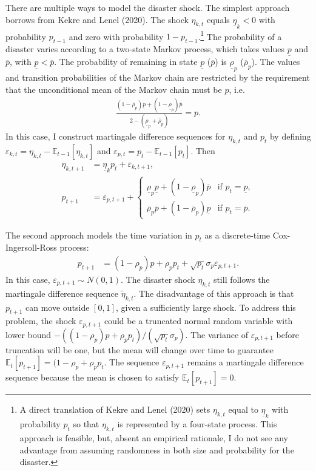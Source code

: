 \documentclass[12 pt, oneside]{article}
\theoremstyle{definition}
\theoremstyle{definition}
\theoremstyle{definition}
\newcommand{\E}{\mathbb{E}}
\begin{document}
There are multiple ways to model the disaster shock. The simplest approach borrows from Kekre and Lenel (2020). The shock $\eta_{k, t}$ equals $\underline{\eta}_k < 0$ with probability $p_{t - 1}$ and zero with probability $1 - p_{t - 1}$.\footnote{A direct translation of Kekre and Lenel (2020) sets $\eta_{k, t}$ equal to $\underline{\eta}_k$ with probability $p_t$ so that $\eta_{k, t}$ is represented by a four-state process. This approach is feasible, but, absent an empirical rationale, I do not see any advantage from assuming randomness in both size and probability for the disaster.} The probability of a disaster varies according to a two-state Markov process, which takes values $\underline{p}$ and $\overline{p}$, with $\underline{p} < \overline{p}$. The probability of remaining in state $\underline{p}$ ($\overline{p}$) is $\underline{\rho}_p$ ($\overline{\rho}_p$). The values and transition probabilities of the Markov chain are restricted by the requirement that the unconditional mean of the Markov chain must be $p$, i.e.
\begin{align*}
  \frac{(1 - \overline{\rho}_p)\underline{p} + (1 - \underline{\rho}_p) \overline{p}}{2 - (\underline{\rho}_p + \overline{\rho}_p)} = p.
\end{align*}
In this case, I construct martingale difference sequences for $\eta_{k, t}$ and $p_t$ by defining $\varepsilon_{k, t} = \eta_{k, t} - \E_{t - 1}[\eta_{k, t}]$ and $\varepsilon_{p, t} = p_t - \E_{t- 1}[p_t]$. Then
\begin{align}
  \eta_{k, t + 1} & = \underline{\eta}_k p_t + \varepsilon_{k, t + 1},\\
  p_{t + 1} & = \varepsilon_{p, t + 1} + \begin{cases}
    \underline{\rho}_p \underline{p} + (1 - \underline{\rho}_p) \overline{p} & \text{if } p_t = \underline{p},\\
    \overline{\rho}_p \overline{p} + (1 - \overline{\rho}_p) \underline{p} & \text{if } p_t = \overline{p}.
  \end{cases}
\end{align}

The second approach models the time variation in $p_t$ as a discrete-time Cox-Ingersoll-Ross process:
\begin{align}
  p_{t + 1} & = (1 - \rho_p) p + \rho_p p_t + \sqrt{p_t}\sigma_p \varepsilon_{p, t + 1}.
\end{align}
In this case, $\varepsilon_{p, t + 1} \sim N(0, 1)$. The disaster shock $\eta_{k, t}$ still follows the martingale difference sequence $\tilde{\eta}_{k, t}$. The disadvantage of this approach is that $p_{t + 1}$ can move outside $[0, 1]$, given a sufficiently large shock. To address this problem,
the shock $\varepsilon_{p, t + 1}$ could be a truncated normal random variable with lower bound $-((1 - \rho_p)p + \rho_p p_t) / (\sqrt{p_t}\sigma_p)$. The variance of $\varepsilon_{p, t + 1}$ before truncation will be one, but the mean will change over time to guarantee $\E_t[p_{t + 1}] = (1 - \rho_p + \rho_p p_t$. The sequence $\varepsilon_{p, t + 1}$ remains a martingale difference sequence because the mean is chosen to satisfy $\E_t[p_{t + 1}] = 0$.
\end{document}
